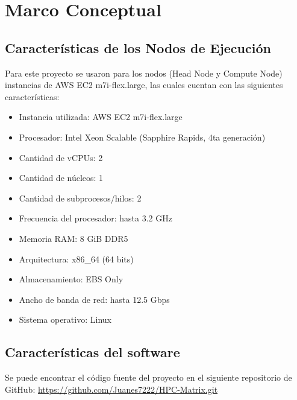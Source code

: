 
\section{Marco Conceptual}
\label{sec:Marco Conceptual}

\subsection{Características de los Nodos de Ejecución}
\label{sec:Características de los Nodos de Ejecución} 

Para este proyecto se usaron para los nodos (Head Node y Compute Node) instancias de AWS EC2 m7i-flex.large, las cuales cuentan con las siguientes características:

\begin{itemize}
   \item Instancia utilizada: AWS EC2 m7i-flex.large
   \item Procesador: Intel Xeon Scalable (Sapphire Rapids, 4ta generación)
   \item Cantidad de vCPUs: 2
   \item Cantidad de núcleos: 1
   \item Cantidad de subprocesos/hilos: 2
   \item Frecuencia del procesador: hasta 3.2 GHz
   \item Memoria RAM: 8 GiB DDR5
   \item Arquitectura: x86\_64 (64 bits)
   \item Almacenamiento: EBS Only
   \item Ancho de banda de red: hasta 12.5 Gbps
   \item Sistema operativo: Linux
\end{itemize}


\subsection{Características del software}

Se puede encontrar el código fuente del proyecto en el siguiente repositorio de GitHub: \url{https://github.com/Juanes7222/HPC-Matrix.git}

